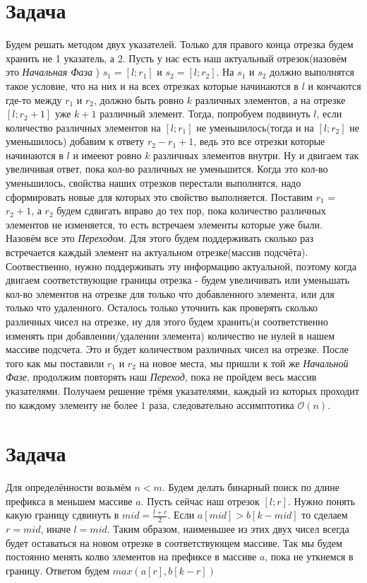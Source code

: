 \documentclass{article}
\begin{document}
\section*{Задача }
Будем решать методом двух указателей. Только для правого конца отрезка будем хранить не 1 указатель, а 2.
\newline
 Пусть у нас есть наш актуальный отрезок(назовём это \textit{Начальная Фаза }) $s_{1} = [l; r_{1}]$ и $s_{2} = [l; r_{2}]$. На $s_{1}$ и $s_{2}$ должно выполнятся такое условие, что на них и на всех отрезках которые начинаются в $l$ и кончаются где-то между $r_{1}$ и $r_{2}$, должно быть ровно $k$ различных элементов, а на отрезке $[l; r_{2} + 1]$ уже $k + 1$ различный элемент.
\newline
 Тогда, попробуем подвинуть $l$, если количество различных элементов на $[l; r_1]$ не уменьшилось(тогда и на $[l; r_2]$ не уменьшилось) добавим к ответу $r_{2} - r_{1} + 1$, ведь это все отрезки которые начинаются в $l$ и имееют ровно $k$ различных элементов внутри. Ну и двигаем так увеличивая ответ, пока кол-во различных не уменьшится.
\newline
 Когда это кол-во уменьшилось, свойства наших отрезков перестали выполнятся, надо сформировать новые для которых это свойство выполняется. Поставим $r_{1}$ = $r_{2} + 1$, а $r_{2}$ будем сдвигать вправо до тех пор, пока количество различных элементов не изменяется, то есть встречаем элементы которые уже были. Назовём все это \textit{Переходом}.
\newline
Для этого будем поддерживать сколько раз встречается каждый элемент на актуальном отрезке(массив подсчёта). Соотвественно, нужно поддерживать эту информацию актуальной, поэтому когда двигаем соответствующие границы отрезка - будем увеличивать или уменьшать кол-во элементов на отрезке для только что добавленного элемента, или для только что удаленного.
\newline
 Осталось только уточнить как проверять сколько различных чисел на отрезке, ну для этого будем хранить(и соответственно изменять при добавлении/удалении элемента) количество не нулей в нашем массиве подсчета. Это и будет количеством различных чисел на отрезке.
\newline
После того как мы поставили $r_{1}$ и $r_{2}$ на новое места, мы пришли к той же \textit{Начальной Фазе}, продолжим повторять наш \textit{Переход}, пока не пройдем весь массив указателями.
\newline
Получаем решение трёмя указателями, каждый из которых проходит по каждому элементу не более $1$ раза, следовательно ассимптотика $\mathcal{O}(n)$.
\section*{Задача }
Для определённости возьмём $n < m$. Будем делать бинарный поиск по длине префикса в меньшем массиве $a$. Пусть сейчас наш отрезок $[l; r]$. Нужно понять какую границу сдвинуть в $mid = \frac{l + r}{2}$. Если $a[mid] > b[k - mid]$ то сделаем $r = mid$, иначе $l = mid$. Таким образом, наименьшее из этих двух чисел всегда будет оставаться на новом отрезке в соответствующем массиве. Так мы будем постоянно менять колво элементов на префиксе в массиве $a$, пока не уткнемся в границу. Ответом	 будем $max(a[r], b[k - r])$
\end{document}
